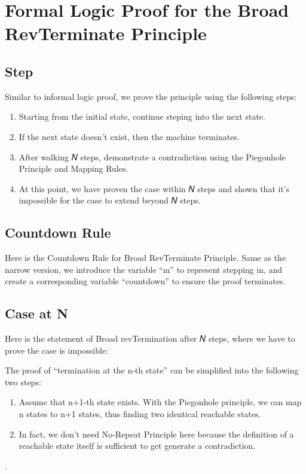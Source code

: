 \section{Formal Logic Proof for the Broad RevTerminate Principle}

\subsection{ Step }


Similar to informal logic proof, we prove the principle using the following steps:
\begin{enumerate}[1.]
    \item Starting from the initial state, continue steping into the next state.
    \item If the next state doesn't exist, then the machine terminates.
    \item After walking 𝑁 steps, demonstrate a contradiction using the Piegonhole Principle and Mapping Rules.
    \item At this point, we have proven the case within 𝑁 steps and shown that it's impossible for the case to extend beyond 𝑁 steps.
\end{enumerate}

\subsection{ Countdown Rule }
Here is the Countdown Rule for Broad RevTerminate Principle.
Same as the narrow version, we introduce the variable ``m'' to represent stepping in, and create a corresponding variable ``countdown'' to ensure the proof terminates.


\subsection{ Case at N }
Here is the statement of Broad revTermination after 𝑁 steps, where we have to prove the case is impossible:


The proof of ``termination at the n-th state'' can be simplified into the following two steps:
\begin{enumerate}[1.]
    \item Assume that n+1-th state exists.  With the Piegonhole principle, we can map n states to n+1 states, thus finding two identical reachable states.
    \item In fact, we don't need No-Repeat Principle here because the definition of a reachable state itself is sufficient to get generate a contradiction.
\end{enumerate}.

